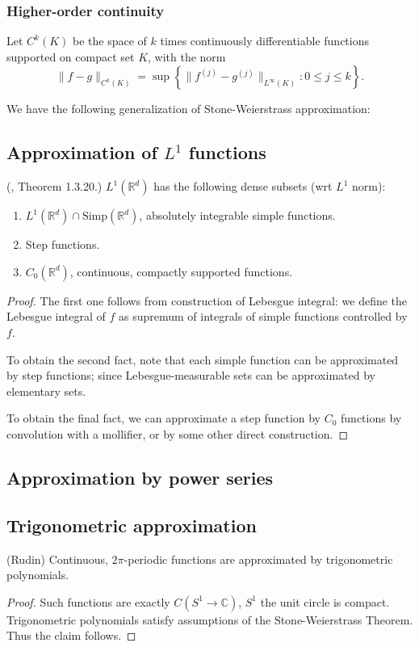 \subsubsection{Higher-order continuity}

Let $C^k(K)$ be the space of $k$ times continuously differentiable functions supported on compact set $K$, with the norm
\[
	\|f - g\|_{C^k(K)} = \sup \left\{\|f^{(j)} - g^{(j)}\|_{L^\infty (K)}: 0 \le j \le  k\right\} 
.\] 

We have the following generalization of Stone-Weierstrass approximation:


\subsection{Approximation of $L^1$ functions}

\begin{theorem}
	(\cite{taoMeasureTheory2011}, Theorem 1.3.20.)
	$L^1(\mathbb{R}^d)$ has the following dense subsets (wrt $L^1$ norm):
	\begin{enumerate}
		\item $L^1(\mathbb{R}^d) \cap \text{Simp}(\mathbb{R}^d)$, absolutely integrable simple functions.
		\item Step functions.
		\item $C_0(\mathbb{R}^d)$, continuous, compactly supported functions.
	\end{enumerate}
\end{theorem}
\begin{proof}
	The first one follows from construction of Lebesgue integral: we define the Lebesgue integral of $f$ as supremum of integrals of simple functions controlled by $f$. 

	To obtain the second fact, note that each simple function can be approximated by step functions; since Lebesgue-measurable sets can be approximated by elementary sets.

	To obtain the final fact, we can approximate a step function by $C_0$ functions by convolution with a mollifier, or by some other direct construction.
\end{proof}

\subsection{Approximation by power series}


\subsection{Trigonometric approximation}

\begin{theorem}
	(Rudin) Continuous, $2 \pi$-periodic functions are approximated by trigonometric polynomials.
\end{theorem}
\begin{proof}
	Such functions are exactly $C(S^1 \to \mathbb{C})$, $S^1$ the unit circle is compact. Trigonometric polynomials satisfy assumptions of the Stone-Weierstrass Theorem. Thus the claim follows.
\end{proof}






